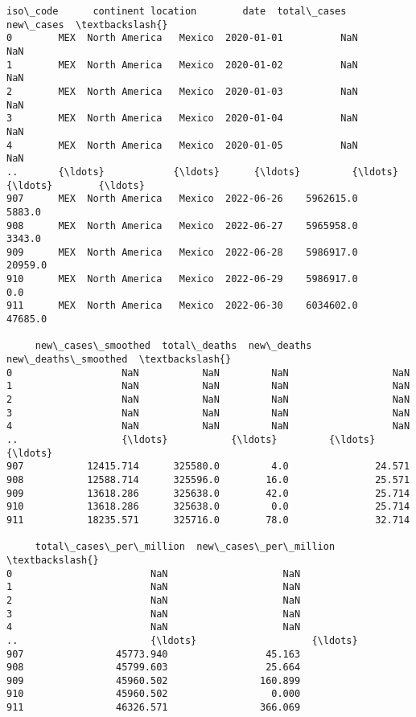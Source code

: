 \documentclass[11pt]{article}
\makeatletter
\newcommand{\boxspacing}{\kern\kvtcb@left@rule\kern\kvtcb@boxsep}
\newcommand{\prompt}[4]{
        {\ttfamily\llap{{\color{#2}[#3]:\hspace{3pt}#4}}\vspace{-\baselineskip}}
    }
\makeatother
\begin{document}
            \begin{tcolorbox}[breakable, size=fbox, boxrule=.5pt, pad at break*=1mm, opacityfill=0]
\prompt{Out}{outcolor}{25}{\boxspacing}
\begin{Verbatim}[commandchars=\\\{\}]
    iso\_code      continent location        date  total\_cases  new\_cases  \textbackslash{}
0        MEX  North America   Mexico  2020-01-01          NaN        NaN
1        MEX  North America   Mexico  2020-01-02          NaN        NaN
2        MEX  North America   Mexico  2020-01-03          NaN        NaN
3        MEX  North America   Mexico  2020-01-04          NaN        NaN
4        MEX  North America   Mexico  2020-01-05          NaN        NaN
..       {\ldots}            {\ldots}      {\ldots}         {\ldots}          {\ldots}        {\ldots}
907      MEX  North America   Mexico  2022-06-26    5962615.0     5883.0
908      MEX  North America   Mexico  2022-06-27    5965958.0     3343.0
909      MEX  North America   Mexico  2022-06-28    5986917.0    20959.0
910      MEX  North America   Mexico  2022-06-29    5986917.0        0.0
911      MEX  North America   Mexico  2022-06-30    6034602.0    47685.0

     new\_cases\_smoothed  total\_deaths  new\_deaths  new\_deaths\_smoothed  \textbackslash{}
0                   NaN           NaN         NaN                  NaN
1                   NaN           NaN         NaN                  NaN
2                   NaN           NaN         NaN                  NaN
3                   NaN           NaN         NaN                  NaN
4                   NaN           NaN         NaN                  NaN
..                  {\ldots}           {\ldots}         {\ldots}                  {\ldots}
907           12415.714      325580.0         4.0               24.571
908           12588.714      325596.0        16.0               25.571
909           13618.286      325638.0        42.0               25.714
910           13618.286      325638.0         0.0               25.714
911           18235.571      325716.0        78.0               32.714

     total\_cases\_per\_million  new\_cases\_per\_million  \textbackslash{}
0                        NaN                    NaN
1                        NaN                    NaN
2                        NaN                    NaN
3                        NaN                    NaN
4                        NaN                    NaN
..                       {\ldots}                    {\ldots}
907                45773.940                 45.163
908                45799.603                 25.664
909                45960.502                160.899
910                45960.502                  0.000
911                46326.571                366.069


\end{Verbatim}
\end{tcolorbox}
\end{document}
